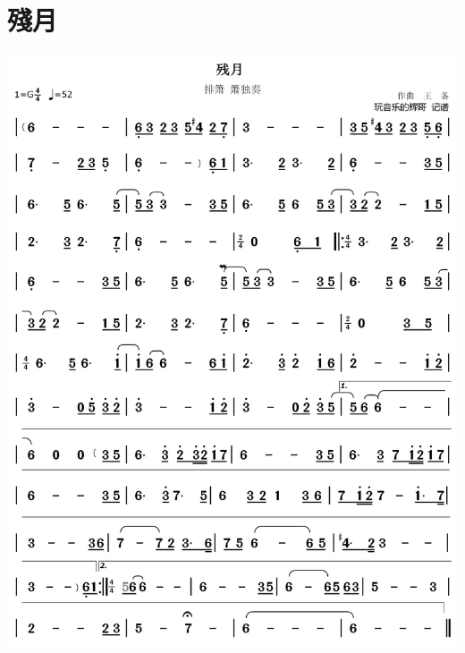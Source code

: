 \documentclass[cn,pad,twocol]{elegantbook}
\begin{document}
\section{殘月}
    \includegraphics[width=\textwidth]{dongxiao/20201231-残月}
\end{document}
